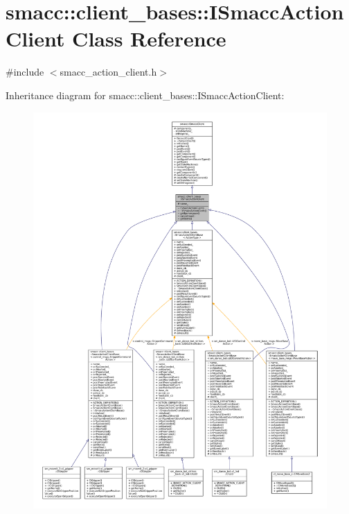 \hypertarget{classsmacc_1_1client__bases_1_1ISmaccActionClient}{}\section{smacc\+:\+:client\+\_\+bases\+:\+:I\+Smacc\+Action\+Client Class Reference}
\label{classsmacc_1_1client__bases_1_1ISmaccActionClient}


{\ttfamily \#include $<$smacc\+\_\+action\+\_\+client.\+h$>$}



Inheritance diagram for smacc\+:\+:client\+\_\+bases\+:\+:I\+Smacc\+Action\+Client\+:
\nopagebreak
\begin{figure}[H]
\begin{center}
\leavevmode
\includegraphics[width=350pt]{classsmacc_1_1client__bases_1_1ISmaccActionClient__inherit__graph}
\end{center}
\end{figure}


